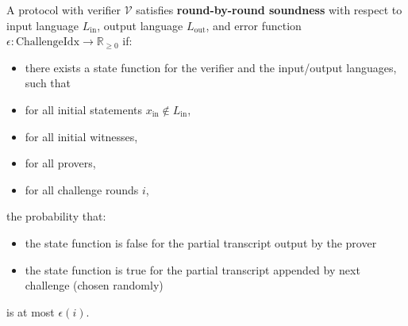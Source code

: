 \begin{definition}
    \label{def:round_by_round_soundness}
    A protocol with verifier $\mathcal{V}$ satisfies \textbf{round-by-round soundness} with respect to input language
    $L_{\text{in}}$, output language $L_{\text{out}}$, and error function $\epsilon: \text{ChallengeIdx} \to \mathbb{R}_{\geq 0}$ if:
    \begin{itemize}
        \item there exists a state function for the verifier and the input/output languages, such that
        \item for all initial statements $x_{\text{in}} \notin L_{\text{in}}$,
        \item for all initial witnesses,
        \item for all provers,
        \item for all challenge rounds $i$,
    \end{itemize}
    the probability that:
    \begin{itemize}
        \item the state function is false for the partial transcript output by the prover
        \item the state function is true for the partial transcript appended by next challenge (chosen randomly)
    \end{itemize}
    is at most $\epsilon(i)$.
\end{definition}

